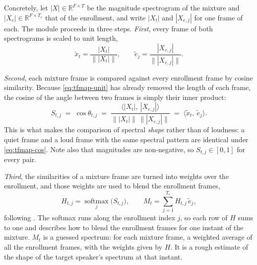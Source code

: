 Concretely, let $|X| \in \mathbb{R}^{F \times T}$ be the magnitude spectrogram of the mixture and $|X_e| \in \mathbb{R}^{F \times T_e}$ that of the enrollment, and write $|X_t|$ and $|X_{e,j}|$ for one frame of each. The module proceeds in three steps. 
\emph{First}, every frame of both spectrograms is scaled to unit length,
\begin{equation}
\tilde{x}_t = \frac{|X_t|}{\big\lVert |X_t| \big\rVert},
\qquad
\tilde{e}_j = \frac{|X_{e,j}|}{\big\lVert |X_{e,j}| \big\rVert}.
\label{eq:tfmap-unit}
\end{equation}

\emph{Second}, each mixture frame is compared against every enrollment frame by cosine similarity. Because \eqref{eq:tfmap-unit} has already removed the length of each frame, the cosine of the angle between two frames is simply their inner product:
\begin{equation}
S_{t,j}
  \;=\; \cos \theta_{t,j}
  \;=\; \frac{\big\langle |X_t|,\ |X_{e,j}| \big\rangle}
             {\big\lVert |X_t| \big\rVert \, \big\lVert |X_{e,j}| \big\rVert}
  \;=\; \big\langle \tilde{x}_t,\ \tilde{e}_j \big\rangle .
\label{eq:tfmap-cos}
\end{equation}
This is what makes the comparison of spectral \emph{shape} rather than of loudness: a quiet frame and a loud frame with the same spectral pattern are identical under \eqref{eq:tfmap-cos}. Note also that magnitudes are non-negative, so $S_{t,j} \in [0, 1]$ for every pair.

\emph{Third}, the similarities of a mixture frame are turned into weights over the enrollment, and those weights are used to blend the enrollment frames,
\begin{equation}
H_{t,j} = \operatorname*{softmax}_{j} \big( S_{t,j} \big),
\qquad
M_t = \sum_{j=1}^{T_e} H_{t,j}\, \tilde{e}_j,
\label{eq:tfmap}
\end{equation}
following \cite{zhang2025multi}. The softmax runs along the enrollment index $j$, so each row of $H$ sums to one and describes how to blend the enrollment frames for one instant of the mixture. $M_t$ is a guessed spectrum: for each mixture frame, a weighted average of all the enrollment frames, with the weights given by $H$. It is a rough estimate of the shape of the target speaker's spectrum at that instant.

